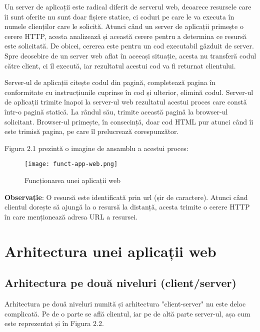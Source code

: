 Un server de aplicații este radical diferit de serverul web, deoarece resursele care îi sunt oferite nu sunt doar fișiere statice, ci coduri pe care le va executa în numele clienților care le solicită. Atunci când un server de aplicații primește o cerere HTTP, acesta analizează și această cerere pentru a determina ce resursă este solicitată. De obicei, cererea este pentru un cod executabil găzduit de server. Spre deosebire de un server web aflat în aceeași situație, acesta nu transferă codul către client, ci îl execută, iar rezultatul acestui cod va fi returnat clientului.\newline

Server-ul de aplicații citește codul din pagină, completează pagina în conformitate cu instrucțiunile cuprinse în cod și ulterior, elimină codul. Server-ul de aplicații trimite înapoi la server-ul web rezultatul acestui proces care constă într-o pagină statică. La rândul său, trimite această pagină la browser-ul solicitant. Browser-ul primește, în consecință, doar cod HTML pur atunci când îi este trimisă pagina, pe care îl prelucrează corespunzător.\newline

Figura 2.1 prezintă o imagine de ansamblu a acestui proces:\newline

\begin{figure}[H]
	\begin{center}
		\texttt{[image: funct-app-web.png]}
		\caption{Funcționarea unei aplicații web}
	\end{center}
\end{figure}

\textbf{Observație}: O resursă este identificată prin url (șir de caractere). Atunci când clientul dorește să ajungă la o resursă la distanță, acesta trimite o cerere HTTP în care menționează adresa URL a resursei.
\newline

\section{Arhitectura unei aplicații web}
\subsection{Arhitectura pe două niveluri (client/server)}
Arhitectura pe două niveluri numită și arhitectura "client-server" nu este deloc complicată. Pe de o parte se află clientul, iar pe de altă parte server-ul, așa cum este reprezentat și în Figura 2.2.\newline

